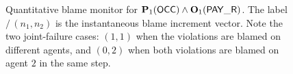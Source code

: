 \begin{example}
\begin{figure}[h!]
\begin{tikzpicture}
\end{tikzpicture}
\caption{Quantitative blame monitor for $\perm[1]{\OCC} \wedge \obl[1]{\PAY}$. The label $/\,(n_1,n_2)$ is the instantaneous blame increment vector.
Note the two joint-failure cases: $(1,1)$ when the violations are blamed on different agents, and $(0,2)$ when both violations are blamed on agent $2$ in the same step.}
\label{fig:qbm-joint-blame}
\end{figure}
\end{example}






